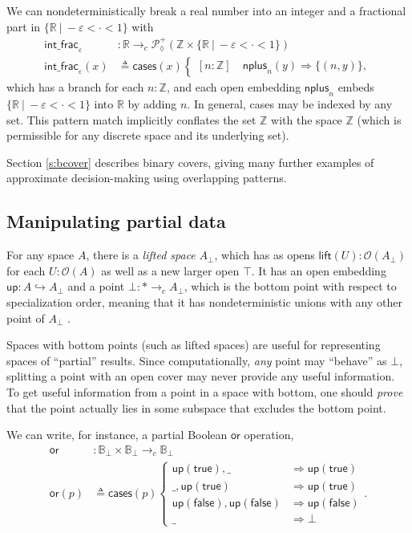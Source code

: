 \documentclass[conference]{IEEEtran}
\newcommand{\PLower}{\mathcal{P}_\lozenge}
\newcommand{\hookto}{\hookrightarrow}
\newcommand{\cto}{\to_c}
\newcommand{\R}{\mathbb{R}}
\newcommand{\Z}{\mathbb{Z}}
\newcommand{\suchthat}{\ |\ }
\newcommand{\One}{\ast}
\newcommand{\Open}[1]{\mathcal{O}({#1})}
\newcommand{\bool}{\mathbb{B}}
\newcommand{\wildcard}{\_}
\newcommand{\Branch}{\Rightarrow}
\newcommand{\up}{\mathsf{up}}
\newcommand{\btrue}{\mathsf{true}}
\newcommand{\bfalse}{\mathsf{false}}
\begin{document}
We can nondeterministically break a real number into an integer and a fractional part in $\{ \R \suchthat -\varepsilon < \cdot < 1 \}$ with
\begin{align*}
\mathsf{int\_frac}_\varepsilon &: \R \cto \PLower^+(\Z \times \{ \R \suchthat -\varepsilon < \cdot < 1 \})
\\ \mathsf{int\_frac}_\varepsilon(x) &\triangleq \mathsf{cases}(x)
\begin{cases}
[n : \Z] \quad \mathsf{nplus}_n(y) \Branch \{ (n, y) \},
\end{cases}
\end{align*}
which has a branch for each $n : \Z$, and each open embedding $\mathsf{nplus}_n$ embeds $\{ \R \suchthat -\varepsilon < \cdot < 1 \}$ into $\R$ by adding $n$. In general, cases may be indexed by any set. This pattern match implicitly conflates the set $\Z$ with the space $\Z$ (which is permissible for any discrete space and its underlying set).

Section \ref{s:bcover} describes binary covers, giving many further examples of approximate decision-making using overlapping patterns.

\subsection{Manipulating partial data}
\label{s:ex:partial}

For any space $A$, there is a \emph{lifted space} $A_\bot$, which has as opens $\mathsf{lift}(U) : \Open{A_\bot}$ for each $U : \Open{A}$ as well as a new larger open $\top$. It has an open embedding $ \up : A \hookto A_\bot$ and a point $\bot : \One \cto A_\bot$, which is the bottom point with respect to specialization order, meaning that it has nondeterministic unions with any other point of $A_\bot$ \cite{topologyvialogic}.

Spaces with bottom points (such as lifted spaces) are useful for representing spaces of ``partial'' results. Since computationally, \emph{any} point may ``behave'' as $\bot$, splitting a point with an open cover may never provide any useful information. To get useful information from a point in a space with bottom, one should \emph{prove} that the point actually lies in some subspace that excludes the bottom point.

We can write, for instance, a partial Boolean $\mathsf{or}$ operation,
\begin{align*}
\mathsf{or} &: \bool_\bot \times \bool_\bot \cto \bool_\bot
\\ \mathsf{or}(p) &\triangleq \mathsf{cases}(p)
\begin{cases}
\up(\btrue), \wildcard &\Branch \up(\btrue)
\\ \wildcard, \up(\btrue) &\Branch \up(\btrue)
\\ \up(\bfalse), \up(\bfalse) &\Branch \up(\bfalse)
\\ \wildcard &\Branch \bot
\end{cases}.
\end{align*}
\end{document}
